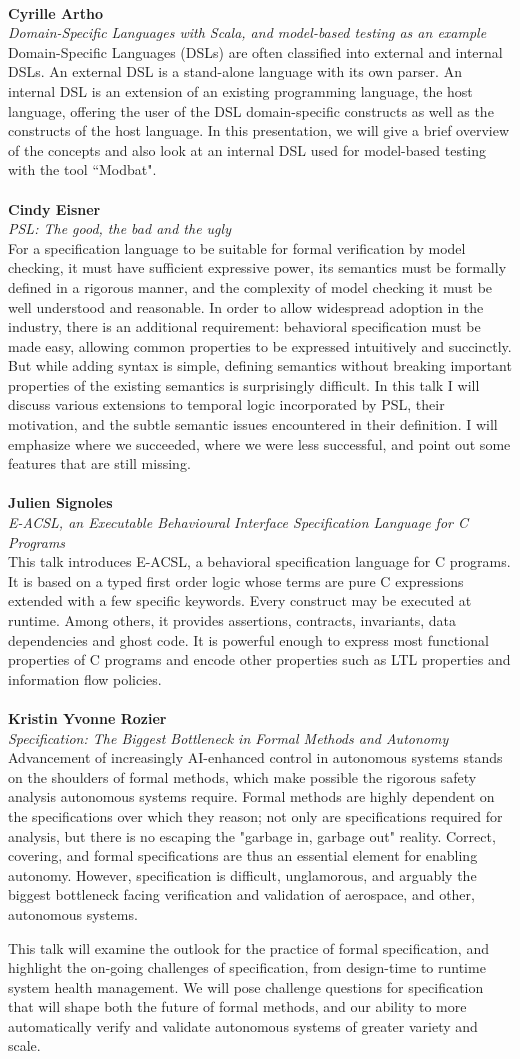 \documentclass{article}
\newcounter{talkc}
\newcommand{\talk}[3]{\stepcounter{talkc}
\vspace{0.5em}~\\
\noindent
\textbf{#1}\\ 
\noindent\emph{#2}\\ 
\noindent#3\\
}
\begin{document}
\talk{Cyrille Artho}{Domain-Specific Languages with Scala, and model-based testing as an example}
{Domain-Specific Languages (DSLs) are often classified into external and internal DSLs. An external DSL is a stand-alone language with its own parser. An internal DSL is an extension of an existing programming language, the host language, offering the user of the DSL domain-specific constructs as well as the constructs of the host language. In this presentation, we will give a brief overview of the concepts and also look at an internal DSL used for model-based testing with the tool ``Modbat".}
%
\talk{Cindy Eisner}{PSL: The good, the bad and the ugly}{For a specification language to be suitable for formal verification by model checking, it must have sufficient expressive power, its semantics must be formally defined in a rigorous manner, and the complexity of model checking it must be well understood and reasonable. In order to allow widespread adoption in the industry, there is an additional requirement: behavioral specification must be made easy, allowing common properties to be expressed intuitively and succinctly. But while adding syntax is simple, defining semantics without breaking important properties of the existing semantics is surprisingly difficult. In this talk I will discuss various extensions to temporal logic incorporated by PSL, their motivation, and the subtle semantic issues encountered in their definition. I will emphasize where we succeeded, where we were less successful, and point out some features that are still missing.}
\talk{Julien Signoles}{E-ACSL, an Executable Behavioural Interface Specification Language for C Programs}{This talk introduces E-ACSL, a behavioral specification language for C programs. It is based on a typed first order logic whose terms are pure C expressions extended with a few specific keywords. Every construct may be executed at runtime. Among others, it provides assertions, contracts, invariants, data dependencies and ghost code. It is powerful enough to express most functional properties of C programs and encode other properties such as LTL properties and information flow policies.}
\talk{Kristin Yvonne Rozier} {Specification: The Biggest Bottleneck in Formal Methods and Autonomy}{Advancement of increasingly AI-enhanced control in autonomous systems stands on the shoulders of formal methods, which make possible the rigorous safety analysis autonomous systems require. Formal methods are highly dependent on the specifications over which they reason; not only are specifications required for analysis, but there is no escaping the "garbage in, garbage out" reality. Correct, covering, and formal specifications are thus an essential element for enabling autonomy. However, specification is difficult, unglamorous, and arguably the biggest bottleneck facing verification and validation of aerospace, and other, autonomous systems. 

This talk will examine the outlook for the practice of formal specification, and highlight the on-going challenges of specification, from design-time to runtime system health management. We will pose challenge questions for specification that will shape both the future of formal methods, and our ability to more automatically verify and validate autonomous systems of greater variety and scale. }
\end{document}

